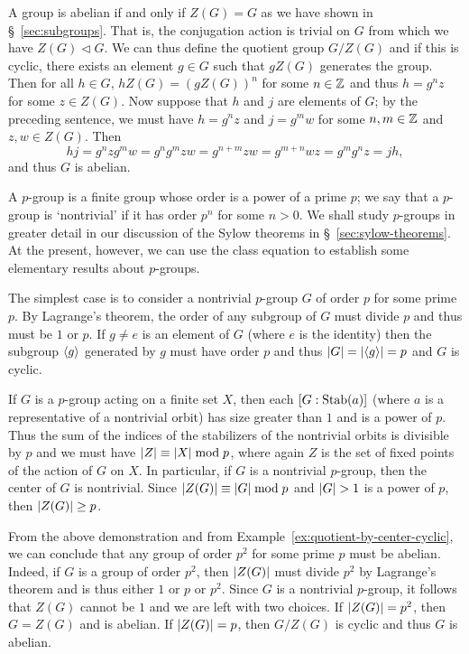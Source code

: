 \begin{example}
    \label{ex:quotient-by-center-cyclic}
    A group is abelian if and only if \(Z(G) = G\) as we have shown in
    \S~\ref{sec:subgroups}. That is, the conjugation action is trivial on \(G\)
    from which we have \(Z(G) \triangleleft G\). We can thus define the quotient
    group \(G/Z(G)\) and if this is cyclic, there exists an element \(g \in G\)
    such that \(gZ(G)\) generates the group. Then for all \(h \in G\), \(hZ(G) =
    (gZ(G))^n\) for some \(n \in \mathbb{Z}\) and thus \(h = g^nz\) for some \(z \in
    Z(G)\). Now suppose that \(h\) and \(j\) are elements of \(G\); by the
    preceding sentence, we must have \(h = g^nz\) and \(j = g^mw\) for some \(n,
    m \in \mathbb{Z}\) and \(z, w \in Z(G)\). Then
    \[
        hj = g^nzg^mw = g^ng^mzw = g^{n+m}zw = g^{m+n}wz = g^mg^nz = jh,
    \]
    and thus \(G\) is abelian.
\end{example}

\begin{example}
    A \(p\)-group is a finite group whose order is a power of a prime \(p\); we
    say that a \(p\)-group is `nontrivial' if it has order \(p^n\) for some \(n
    > 0\). We shall study \(p\)-groups in greater detail in our discussion of
    the Sylow theorems in \S~\ref{sec:sylow-theorems}. At the present, however,
    we can use the class equation to establish some elementary results about
    \(p\)-groups.

    The simplest case is to consider a nontrivial \(p\)-group \(G\) of order
    \(p\) for some prime \(p\). By Lagrange's theorem, the order of any subgroup
    of \(G\) must divide \(p\) and thus must be \(1\) or \(p\). If \(g \neq e\)
    is an element of \(G\) (where \(e\) is the identity) then the subgroup
    \(\langle g \rangle\) generated by \(g\) must have order \(p\) and thus \(\lvert G \rvert =
    \lvert \langle g \rangle \rvert = p\) and \(G\) is cyclic.

    If \(G\) is a \(p\)-group acting on a finite set \(X\), then each \([G :
    \operatorname{Stab}(a)]\) (where \(a\) is a representative of a nontrivial orbit) has size
    greater than \(1\) and is a power of \(p\). Thus the sum of the indices of
    the stabilizers of the nontrivial orbits is divisible by \(p\) and we must
    have \(\lvert Z \rvert \equiv \lvert X \rvert \bmod p\), where again \(Z\) is the set of
    fixed points of the action of \(G\) on \(X\). In particular, if \(G\) is a
    nontrivial \(p\)-group, then the center of \(G\) is nontrivial. Since
    \(\lvert Z(G) \rvert \equiv \lvert G \rvert \bmod p\) and \(\lvert G \rvert > 1\) is a power
    of \(p\), then \(\lvert Z(G) \rvert \geq p\).

    From the above demonstration and from
    Example~\ref{ex:quotient-by-center-cyclic}, we can conclude that any group
    of order \(p^2\) for some prime \(p\) must be abelian. Indeed, if \(G\) is a
    group of order \(p^2\), then \(\lvert Z(G) \rvert\) must divide \(p^2\) by
    Lagrange's theorem and is thus either \(1\) or \(p\) or \(p^2\). Since \(G\)
    is a nontrivial \(p\)-group, it follows that \(Z(G)\) cannot be \(1\) and we
    are left with two choices. If \(\lvert Z(G) \rvert = p^2\), then \(G = Z(G)\) and
    is abelian. If \(\lvert Z(G) \rvert = p\), then \(G/Z(G)\) is cyclic and thus
    \(G\) is abelian.
\end{example}


